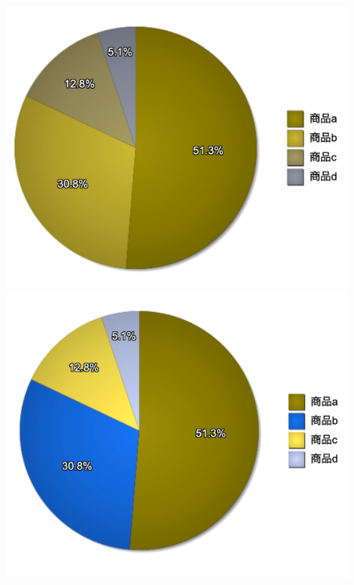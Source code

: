 \begin{figure}[H]
\begin{minipage}[b]{.49\columnwidth}
    \end{minipage}
    \begin{minipage}[b]{.49\columnwidth}
        \centering
        \includegraphics[keepaspectratio,width=\textwidth]{../../10_UniversalDesign/no2_circle_CC_D.png}
    \end{minipage}
    \begin{minipage}[b]{.49\columnwidth}
        \centering
        \includegraphics[keepaspectratio,width=\textwidth]{../../10_UniversalDesign/no2_circle_RC_D.png}

\end{minipage}
\end{figure}
